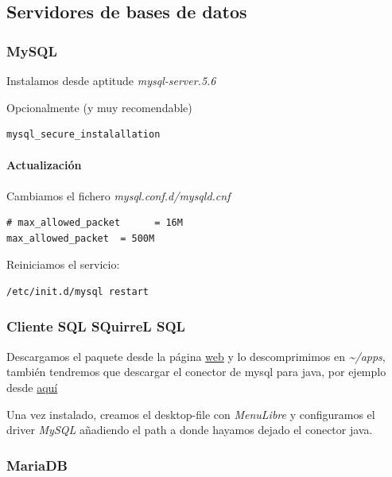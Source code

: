 \documentclass[12pt,spanish,]{scrartcl}
\let\oldparagraph\paragraph
\renewcommand{\paragraph}[1]{\oldparagraph{#1}\mbox{}}
\begin{document}
\subsection{Servidores de bases de
datos}\label{servidores-de-bases-de-datos}

\subsubsection{MySQL}\label{mysql}

Instalamos desde aptitude \emph{mysql-server.5.6}

Opcionalmente (y muy recomendable)

\begin{verbatim}
mysql_secure_instalallation
\end{verbatim}

\paragraph{Actualización}\label{actualizaciuxf3n}

Cambiamos el fichero \emph{mysql.conf.d/mysqld.cnf}

\begin{verbatim}
# max_allowed_packet      = 16M
max_allowed_packet  = 500M
\end{verbatim}

Reiniciamos el servicio:

\begin{verbatim}
/etc/init.d/mysql restart
\end{verbatim}

\subsubsection{Cliente SQL SQuirreL SQL}\label{cliente-sql-squirrel-sql}

Descargamos el paquete desde la página
\href{http://squirrel-sql.sourceforge.net/}{web} y lo descomprimimos en
\emph{\textasciitilde{}/apps}, también tendremos que descargar el
conector de mysql para java, por ejemplo desde
\href{http://dev.mysql.com/downloads/connector/j/3.0.html}{aquí}

Una vez instalado, creamos el desktop-file con \emph{MenuLibre} y
configuramos el driver \emph{MySQL} añadiendo el path a donde hayamos
dejado el conector java.

\subsubsection{MariaDB}\label{mariadb}
\end{document}
